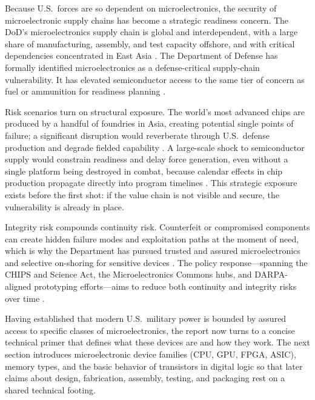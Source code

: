 Because U.S.\ forces are so dependent on microelectronics, the security of microelectronic supply chains has become a strategic readiness concern. The DoD's microelectronics supply chain is global and interdependent, with a large share of manufacturing, assembly, and test capacity offshore, and with critical dependencies concentrated in East Asia \parencite{U.S.GovernmentAccountabilityOffice2025,TheWhiteHouse2021}. The Department of Defense has formally identified microelectronics as a defense-critical supply-chain vulnerability. It has elevated semiconductor access to the same tier of concern as fuel or ammunition for readiness planning \parencite{U.S.Congress2022,vergun_industry_2024,ch5_dod2022_supplychains}.

Risk scenarios turn on structural exposure. The world's most advanced chips are produced by a handful of foundries in Asia, creating potential single points of failure; a significant disruption would reverberate through U.S.\ defense production and degrade fielded capability \parencite{shivakumar_semiconductors_2022,jones_empty_2023}. A large-scale shock to semiconductor supply would constrain readiness and delay force generation, even without a single platform being destroyed in combat, because calendar effects in chip production propagate directly into program timelines \parencite{NationalSecurityCommissiononArtificialIntelligence2021,ch5_dod2022_supplychains}. This strategic exposure exists before the first shot: if the value chain is not visible and secure, the vulnerability is already in place.

Integrity risk compounds continuity risk. Counterfeit or compromised components can create hidden failure modes and exploitation paths at the moment of need, which is why the Department has pursued trusted and assured microelectronics and selective on-shoring for sensitive devices \parencite{U.S.GovernmentAccountabilityOffice2012,U.S.GovernmentAccountabilityOffice2016,Annett2025, vergun_industry_2024}. The policy response---spanning the CHIPS and Science Act, the Microelectronics Commons hubs, and DARPA-aligned prototyping efforts---aims to reduce both continuity and integrity risks over time \parencite{U.S.Congress2022,lopez_dod_2023,mondschein_securing_2022}.

Having established that modern U.S.\ military power is bounded by assured access to specific classes of microelectronics, the report now turns to a concise technical primer that defines what these devices are and how they work. The next section introduces microelectronic device families (CPU, GPU, FPGA, ASIC), memory types, and the basic behavior of transistors in digital logic so that later claims about design, fabrication, assembly, testing, and packaging rest on a shared technical footing.

